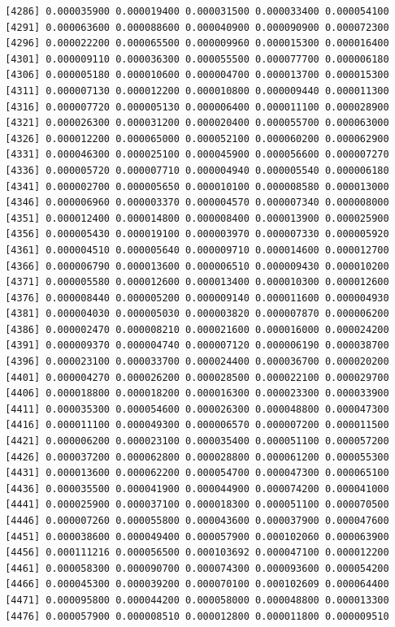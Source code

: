 \documentclass[]{article}
\begin{document}
\begin{verbatim}
 [4286] 0.000035900 0.000019400 0.000031500 0.000033400 0.000054100
 [4291] 0.000063600 0.000088600 0.000040900 0.000090900 0.000072300
 [4296] 0.000022200 0.000065500 0.000009960 0.000015300 0.000016400
 [4301] 0.000009110 0.000036300 0.000055500 0.000077700 0.000006180
 [4306] 0.000005180 0.000010600 0.000004700 0.000013700 0.000015300
 [4311] 0.000007130 0.000012200 0.000010800 0.000009440 0.000011300
 [4316] 0.000007720 0.000005130 0.000006400 0.000011100 0.000028900
 [4321] 0.000026300 0.000031200 0.000020400 0.000055700 0.000063000
 [4326] 0.000012200 0.000065000 0.000052100 0.000060200 0.000062900
 [4331] 0.000046300 0.000025100 0.000045900 0.000056600 0.000007270
 [4336] 0.000005720 0.000007710 0.000004940 0.000005540 0.000006180
 [4341] 0.000002700 0.000005650 0.000010100 0.000008580 0.000013000
 [4346] 0.000006960 0.000003370 0.000004570 0.000007340 0.000008000
 [4351] 0.000012400 0.000014800 0.000008400 0.000013900 0.000025900
 [4356] 0.000005430 0.000019100 0.000003970 0.000007330 0.000005920
 [4361] 0.000004510 0.000005640 0.000009710 0.000014600 0.000012700
 [4366] 0.000006790 0.000013600 0.000006510 0.000009430 0.000010200
 [4371] 0.000005580 0.000012600 0.000013400 0.000010300 0.000012600
 [4376] 0.000008440 0.000005200 0.000009140 0.000011600 0.000004930
 [4381] 0.000004030 0.000005030 0.000003820 0.000007870 0.000006200
 [4386] 0.000002470 0.000008210 0.000021600 0.000016000 0.000024200
 [4391] 0.000009370 0.000004740 0.000007120 0.000006190 0.000038700
 [4396] 0.000023100 0.000033700 0.000024400 0.000036700 0.000020200
 [4401] 0.000004270 0.000026200 0.000028500 0.000022100 0.000029700
 [4406] 0.000018800 0.000018200 0.000016300 0.000023300 0.000033900
 [4411] 0.000035300 0.000054600 0.000026300 0.000048800 0.000047300
 [4416] 0.000011100 0.000049300 0.000006570 0.000007200 0.000011500
 [4421] 0.000006200 0.000023100 0.000035400 0.000051100 0.000057200
 [4426] 0.000037200 0.000062800 0.000028800 0.000061200 0.000055300
 [4431] 0.000013600 0.000062200 0.000054700 0.000047300 0.000065100
 [4436] 0.000035500 0.000041900 0.000044900 0.000074200 0.000041000
 [4441] 0.000025900 0.000037100 0.000018300 0.000051100 0.000070500
 [4446] 0.000007260 0.000055800 0.000043600 0.000037900 0.000047600
 [4451] 0.000038600 0.000049400 0.000057900 0.000102060 0.000063900
 [4456] 0.000111216 0.000056500 0.000103692 0.000047100 0.000012200
 [4461] 0.000058300 0.000090700 0.000074300 0.000093600 0.000054200
 [4466] 0.000045300 0.000039200 0.000070100 0.000102609 0.000064400
 [4471] 0.000095800 0.000044200 0.000058000 0.000048800 0.000013300
 [4476] 0.000057900 0.000008510 0.000012800 0.000011800 0.000009510

\end{verbatim}
\end{document}
